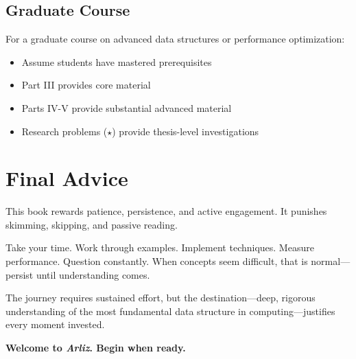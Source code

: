 \subsection*{Graduate Course}

For a graduate course on advanced data structures or performance optimization:

\begin{itemize}
    \item Assume students have mastered prerequisites
    \item Part III provides core material
    \item Parts IV-V provide substantial advanced material
    \item Research problems ($\star$) provide thesis-level investigations
\end{itemize}

\section*{Final Advice}

This book rewards patience, persistence, and active engagement. It punishes skimming, skipping, and passive reading.

Take your time. Work through examples. Implement techniques. Measure performance. Question constantly. When concepts seem difficult, that is normal—persist until understanding comes.

The journey requires sustained effort, but the destination—deep, rigorous understanding of the most fundamental data structure in computing—justifies every moment invested.

\begin{center}
\textbf{Welcome to \textit{Arliz}. Begin when ready.}
\end{center}

\clearpage